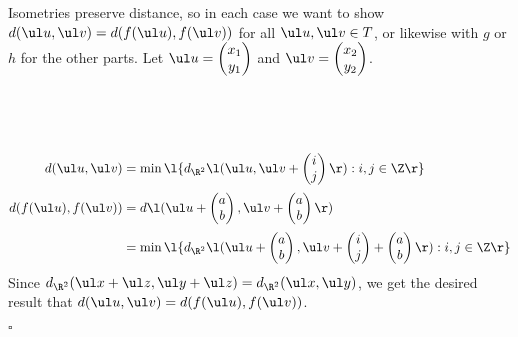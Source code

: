 \documentclass[a4paper]{article}
\begin{document}
Isometries preserve distance, so in each case we want to show $d(\ul u, \ul v) = d(f(\ul u), f(\ul v))$ for all $\ul u, \ul v \in T$, or likewise with $g$ or $h$ for the other parts. Let $\ul u = \begin{pmatrix} x_1 \\ y_1 \end{pmatrix}$ and $\ul v = \begin{pmatrix} x_2 \\ y_2 \end{pmatrix}$.

\subsection{~} %

\begin{align*}
d(\ul u, \ul v) &= \min\l\{ d_{\R^2} \l( \ul u, \ul v + \begin{pmatrix} i \\ j \end{pmatrix} \r)
    : i, j \in \Z \r\} \\[0.5ex]
%
d(f(\ul u), f(\ul v)) &= d \l(
    \ul u + \begin{pmatrix} a \\ b \end{pmatrix},
    \ul v + \begin{pmatrix} a \\ b \end{pmatrix}
\r) \\[0.5ex]
%
&= \min\l\{ d_{\R^2} \l(
    \ul u + \begin{pmatrix} a \\ b \end{pmatrix},
    \ul v + \begin{pmatrix} i \\ j \end{pmatrix} + \begin{pmatrix} a \\ b \end{pmatrix}
\r) : i, j \in \Z \r\}
\end{align*}
Since $d_{\R^2}(\ul x + \ul z, \ul y + \ul z) = d_{\R^2}(\ul x, \ul y)$, we get the desired result that $d(\ul u, \ul v) = d(f(\ul u), f(\ul v))$.

\hfill $\square$

\subsection{~} %
\end{document}
